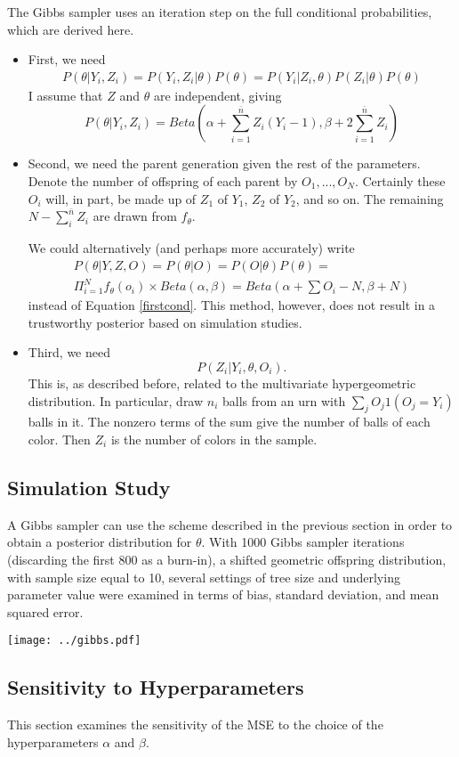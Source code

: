\documentclass[11 pt]{article}
\renewcommand{\th}{\theta}
\newcommand{\fth}{f_{\th}}
\begin{document}
The Gibbs sampler uses an iteration step on the full conditional probabilities, which are derived here.

\begin{itemize}
  \item First, we need
\begin{align*}
P(\th | Y_i, Z_i) = P(Y_i, Z_i | \th) P(\th) = P(Y_i | Z_i, \th) P(Z_i | \th) P(\th)
\end{align*}
I assume that $Z$ and $\th$ are independent, giving
\begin{equation} \label{firstcond}
P(\th | Y_i, Z_i) = Beta(\alpha + \sum_{i = 1}^{\bar{n}} Z_i(Y_i - 1), \beta + 2 \sum_{i = 1}^{\bar{n}} Z_i)
\end{equation}

 \item Second, we need the parent generation given the rest of the parameters. Denote the number of offspring of each parent by $O_1,...,O_N$. Certainly these $O_i$ will, in part, be made up of $Z_1$ of $Y_1$, $Z_2$ of $Y_2$, and so on. The remaining $N - \sum_i^{\bar{n}}Z_i$ are drawn from $\fth$.

We could alternatively (and perhaps more accurately) write
\begin{align*}
P(\th | Y, Z, O) = P(\th | O) = P(O | \th) P(\th) = \\\Pi_{i = 1}^N \fth(o_i) \times Beta(\alpha,\beta) = Beta(\alpha + \sum O_i - N, \beta + N)
\end{align*}
instead of Equation \eqref{firstcond}. This method, however, does not result in a trustworthy posterior based on simulation studies. 

 \item Third, we need
\[
P(Z_i | Y_i, \th, O_i).
\]
This is, as described before, related to the multivariate hypergeometric distribution. In particular, draw $n_i$ balls from an urn with $\sum_j O_j 1(O_j = Y_i)$ balls in it. The nonzero terms of the sum give the number of balls of each color. Then $Z_i$ is the number of colors in the sample. 
\end{itemize}

\subsection{Simulation Study}

A Gibbs sampler can use the scheme described in the previous section in order to obtain a posterior distribution for $\th$. With 1000 Gibbs sampler iterations (discarding the first 800 as a burn-in), a shifted geometric offspring distribution, with sample size equal to 10, several settings of tree size and underlying parameter value were examined in terms of bias, standard deviation, and mean squared error.




\begin{center}
\texttt{[image: ../gibbs.pdf]}
\end{center}

\subsection{Sensitivity to Hyperparameters}

This section examines the sensitivity of the MSE to the choice of the hyperparameters $\alpha$ and $\beta$. 
\end{document}
